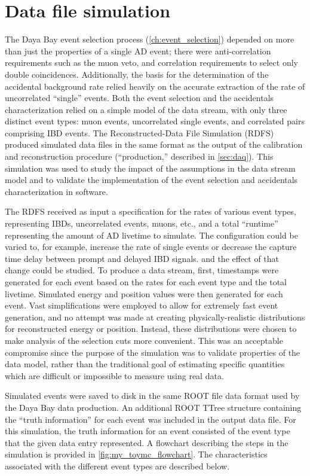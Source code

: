 \section{Data file simulation}
\label{sec:toymc}

The Daya Bay event selection process (\cref{ch:event_selection})
depended on more than just the properties of a single AD event;
there were anti-correlation requirements such as the muon veto,
and correlation requirements to select only double coincidences.
Additionally, the basis for the determination of the accidental background rate
relied heavily on the accurate extraction of
the rate of uncorrelated ``single'' events.
Both the event selection and the accidentals characterization
relied on a simple model of the data stream,
with only three distinct event types:
muon events, uncorrelated single events,
and correlated pairs comprising IBD events.
The Reconstructed-Data File Simulation (RDFS)
produced simulated data files in the same format
as the output of the calibration and reconstruction procedure
(``production,'' described in \cref{sec:daq}).
This simulation was used
to study the impact of the assumptions in the data stream model
and to validate the implementation of
the event selection and accidentals characterization
in software.

The RDFS received as input
a specification for the rates of various event types,
representing IBDs, uncorrelated events, muons, etc.,
and a total ``runtime'' representing the amount of AD livetime to simulate.
The configuration could be varied to, for example,
increase the rate of single events
or decrease the capture time delay between prompt and delayed IBD signals.
and the effect of that change could be studied.
To produce a data stream,
first, timestamps were generated for each event
based on the rates for each event type and the total livetime.
Simulated energy and position values were then generated for each event.
Vast simplifications were employed to allow for
extremely fast event generation,
and no attempt was made at creating
physically-realistic distributions for
reconstructed energy or position.
Instead, these distributions were chosen to make analysis
of the selection cuts more convenient.
This was an acceptable compromise since the purpose of the simulation
was to validate properties of the data model,
rather than the traditional goal of estimating specific quantities
which are difficult or impossible to measure using real data.

Simulated events were saved to disk in the same ROOT file data format
used by the Daya Bay data production.
An additional ROOT TTree structure containing the ``truth information''
for each event was included in the output data file.
For this simulation, the truth information for an event consisted of
the event type that the given data entry represented.
A flowchart describing the steps in the simulation
is provided in \cref{fig:my_toymc_flowchart}.
The characteristics associated with the different event types
are described below.


